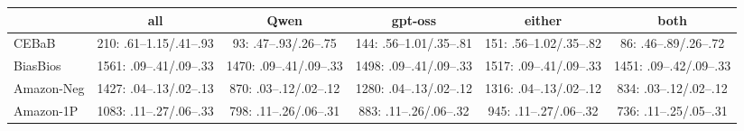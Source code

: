\begin{tabular}{@{}lccccc@{}}
\toprule
 & all & Qwen & gpt-oss & either & both \\
\midrule
CEBaB & 210: .61--1.15/.41--.93 & 93: .47--.93/.26--.75 & 144: .56--1.01/.35--.81 & 151: .56--1.02/.35--.82 & 86: .46--.89/.26--.72 \\
BiasBios & 1561: .09--.41/.09--.33 & 1470: .09--.41/.09--.33 & 1498: .09--.41/.09--.33 & 1517: .09--.41/.09--.33 & 1451: .09--.42/.09--.33 \\
Amazon-Neg & 1427: .04--.13/.02--.13 & 870: .03--.12/.02--.12 & 1280: .04--.13/.02--.12 & 1316: .04--.13/.02--.12 & 834: .03--.12/.02--.12 \\
Amazon-1P & 1083: .11--.27/.06--.33 & 798: .11--.26/.06--.31 & 883: .11--.26/.06--.32 & 945: .11--.27/.06--.32 & 736: .11--.25/.05--.31 \\
\bottomrule
\end{tabular}
